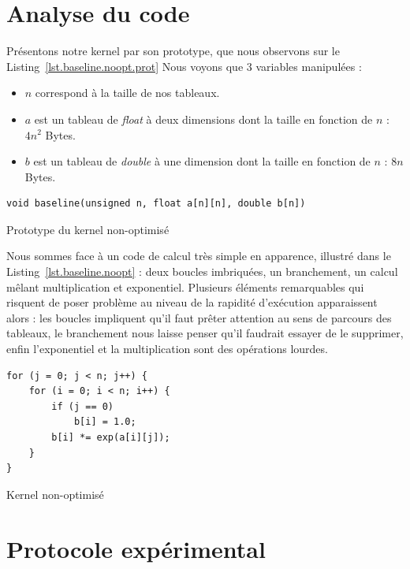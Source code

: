\documentclass[12pt,a4paper]{article}
\begin{document}
\section{Analyse du code}

Présentons notre kernel par son prototype, que nous observons sur le
Listing~\ref{lst.baseline.noopt.prot} Nous voyons que 3 variables manipulées :
\begin{itemize}
    \item $n$ correspond à la taille de nos tableaux.
    \item $a$ est un tableau de \textit{float} à deux dimensions dont la taille
        en fonction de $n$ : $4n^2$ Bytes.
    \item $b$ est un tableau de \textit{double} à une dimension dont la taille
        en fonction de $n$ : $8n$ Bytes.
\end{itemize}

\begin{listing}[h]
    \begin{verbatim}
void baseline(unsigned n, float a[n][n], double b[n])
    \end{verbatim}
    \caption{Prototype du kernel non-optimisé}
    \label{lst.baseline.noopt.prot}
\end{listing}

Nous sommes face à un code de calcul très simple en apparence, illustré dans le
Listing~\ref{lst.baseline.noopt} : deux boucles imbriquées, un branchement, un
calcul mêlant multiplication et exponentiel. Plusieurs éléments remarquables qui
risquent de poser problème au niveau de la rapidité d'exécution apparaissent
alors : les boucles impliquent qu'il faut prêter attention au sens de parcours
des tableaux, le branchement nous laisse penser qu'il faudrait essayer de le
supprimer, enfin l'exponentiel et la multiplication sont des opérations lourdes.

\begin{listing}[h]
    \begin{verbatim}
for (j = 0; j < n; j++) {
    for (i = 0; i < n; i++) {
        if (j == 0)
            b[i] = 1.0;
        b[i] *= exp(a[i][j]);
    }
}
    \end{verbatim}
    \caption{Kernel non-optimisé}
    \label{lst.baseline.noopt}
\end{listing}

\section{Protocole expérimental}
\end{document}
